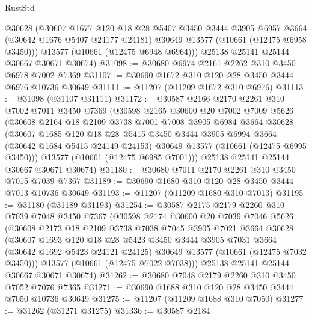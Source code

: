 \begin{lexlean}{RustStd}
\begin{coremodule}
        @30628
        (@30607
          @1677
          @120
          @18
          @28
          @5407
          @3450
          @3444
          @3905
          @6957
          @3664
          (@30642 @1676 @5407 @24177 @24181)
          @30649
          @13577
          (@10661 (@12475 @6958 @3450)))
        @13577
        (@10661 (@12475 @6948 @6964)))
      @25138
      @25141
      @25144
      @30667
      @30671
      @30674)
@31098 := @30680 @6974 @2161 @2262 @310 @3450 @6978 @7002 @7369
@31107 := @30690 @1672 @310 @120 @28 @3450 @3444 @6976 @10736 @30649
@31111 := @11207 (@11209 @1672 @310 @6976)
@31113 := @31098 (@31107 @31111)
@31172 := @30587
    @2166
    @2170
    @2261
    @310
    @7002
    @7011
    @3450
    @7369
    (@30598
      @2165
      @30600
      @20
      @7002
      @7009
      @5626
      (@30608
        @2164
        @18
        @2109
        @3738
        @7001
        @7008
        @3905
        @6984
        @3664
        @30628
        (@30607
          @1685
          @120
          @18
          @28
          @5415
          @3450
          @3444
          @3905
          @6994
          @3664
          (@30642 @1684 @5415 @24149 @24153)
          @30649
          @13577
          (@10661 (@12475 @6995 @3450)))
        @13577
        (@10661 (@12475 @6985 @7001)))
      @25138
      @25141
      @25144
      @30667
      @30671
      @30674)
@31180 := @30680 @7011 @2170 @2261 @310 @3450 @7015 @7039 @7367
@31189 := @30690 @1680 @310 @120 @28 @3450 @3444 @7013 @10736 @30649
@31193 := @11207 (@11209 @1680 @310 @7013)
@31195 := @31180 (@31189 @31193)
@31254 := @30587
    @2175
    @2179
    @2260
    @310
    @7039
    @7048
    @3450
    @7367
    (@30598
      @2174
      @30600
      @20
      @7039
      @7046
      @5626
      (@30608
        @2173
        @18
        @2109
        @3738
        @7038
        @7045
        @3905
        @7021
        @3664
        @30628
        (@30607
          @1693
          @120
          @18
          @28
          @5423
          @3450
          @3444
          @3905
          @7031
          @3664
          (@30642 @1692 @5423 @24121 @24125)
          @30649
          @13577
          (@10661 (@12475 @7032 @3450)))
        @13577
        (@10661 (@12475 @7022 @7038)))
      @25138
      @25141
      @25144
      @30667
      @30671
      @30674)
@31262 := @30680 @7048 @2179 @2260 @310 @3450 @7052 @7076 @7365
@31271 := @30690 @1688 @310 @120 @28 @3450 @3444 @7050 @10736 @30649
@31275 := @11207 (@11209 @1688 @310 @7050)
@31277 := @31262 (@31271 @31275)
@31336 := @30587
    @2184

\end{coremodule}
\end{lexlean}
